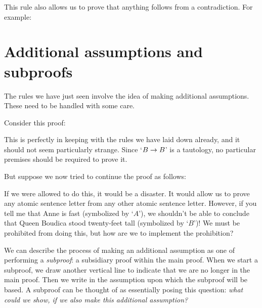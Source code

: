 This rule also allows us to prove that anything follows from a contradiction. For example:
	\begin{fitchproof}
		\open
		\close
	\end{fitchproof}
	
\section{Additional assumptions and subproofs}
The rules we have just seen involve the idea of making additional assumptions. These need to be handled with some care.

Consider this proof:
\begin{fitchproof}
	\hypo{a}{A}
	\open
		\hypo{b1}{B}
		 \Reiteration{b1}
	\close
	\ifI{b1-b2}
\end{fitchproof}
This is perfectly in keeping with the rules we have laid down already, and it should not seem particularly strange. Since `$B \rightarrow B$' is a tautology, no particular premises should be required to prove it.

But suppose we now tried to continue the proof as follows:
\begin{fitchproof}
	\open
		 
	\close
\end{fitchproof}
If we were allowed to do this, it would be a disaster. It would allow us to prove any atomic sentence letter from any other atomic sentence letter. However, if you tell me that Anne is fast (symbolized by `$A$'), we shouldn't be able to conclude that Queen Boudica stood twenty-feet tall (symbolized by `$B$')! We must be prohibited from doing this, but how are we to implement the prohibition?

We can describe the process of making an additional assumption as one of performing a \emph{subproof}: a subsidiary proof within the main proof. When we start a subproof, we draw another vertical line to indicate that we are no longer in the main proof. Then we write in the assumption upon which the subproof will be based. A subproof can be thought of as essentially posing this question: \emph{what could we show, if we also make this additional assumption?}

